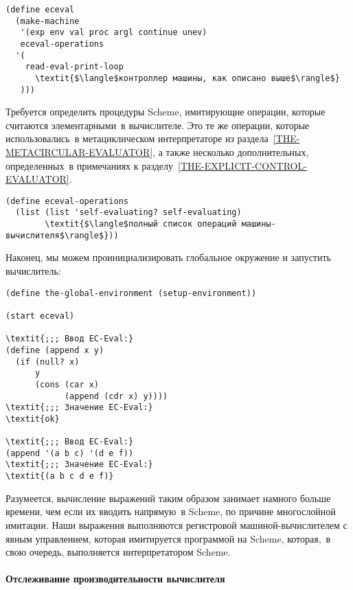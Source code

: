 \begin{Verbatim}[fontsize=\small]
(define eceval
  (make-machine
   '(exp env val proc argl continue unev)
   eceval-operations
  '(
    read-eval-print-loop
      \textit{$\langle$контроллер машины, как описано выше$\rangle$}
   )))
\end{Verbatim}
Требуется определить процедуры Scheme, имитирующие
операции, которые считаются элементарными~в вычислителе.  Это
те же операции, которые использовались~в метациклическом
интерпретаторе из раздела~\ref{THE-METACIRCULAR-EVALUATOR},
а также несколько дополнительных, определенных~в примечаниях к 
разделу~\ref{THE-EXPLICIT-CONTROL-EVALUATOR}.

\begin{Verbatim}[fontsize=\small]
(define eceval-operations
  (list (list 'self-evaluating? self-evaluating)
        \textit{$\langle$полный список операций машины-вычислителя$\rangle$}))
\end{Verbatim}

Наконец, мы можем проинициализировать глобальное окружение
и запустить вычислитель:

\begin{Verbatim}[fontsize=\small]
(define the-global-environment (setup-environment))

(start eceval)

\textit{;;; Ввод EC-Eval:}
(define (append x y)
  (if (null? x)
      y
      (cons (car x)
            (append (cdr x) y))))
\textit{;;; Значение EC-Eval:}
\textit{ok}

\textit{;;; Ввод EC-Eval:}
(append '(a b c) '(d e f))
\textit{;;; Значение EC-Eval:}
\textit{(a b c d e f)}
\end{Verbatim}

Разумеется, вычисление выражений таким образом занимает
намного больше времени, чем если их вводить напрямую~в Scheme, по
причине многослойной имитации.  Наши выражения выполняются
регистровой машиной-вычислителем с явным управлением, которая
имитируется программой на Scheme, которая,~в свою очередь, выполняется
интерпретатором Scheme.
{\sloppy

}

\paragraph{Отслеживание производительности вычислителя}


